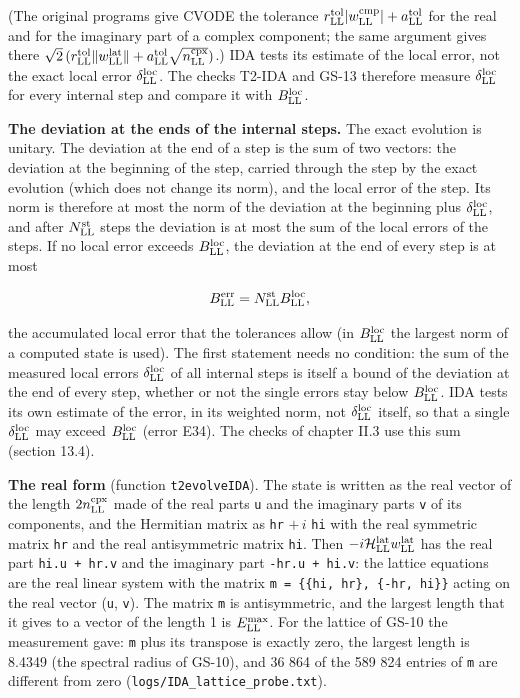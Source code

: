 \documentclass[
  10pt,
]{article}
\begin{document}
(The original programs give CVODE the tolerance
\(r^{\rm tol}_{\rm LL}\lvert w^{\rm cmp}_{\rm LL}\rvert+a^{\rm tol}_{\rm LL}\)
for the real and for the imaginary part of a complex component; the same
argument gives there
\(\sqrt2\,(r^{\rm tol}_{\rm LL}\lVert w^{\rm lat}_{\rm LL}\rVert+a^{\rm tol}_{\rm LL}\sqrt{n^{\rm cpx}_{\rm LL}})\).)
IDA tests its estimate of the local error, not the exact local error
\(\delta^{\rm loc}_{\rm LL}\). The checks T2-IDA and GS-13 therefore
measure \(\delta^{\rm loc}_{\rm LL}\) for every internal step and
compare it with \(B^{\rm loc}_{\rm LL}\).

\textbf{The deviation at the ends of the internal steps.} The exact
evolution is unitary. The deviation at the end of a step is the sum of
two vectors: the deviation at the beginning of the step, carried through
the step by the exact evolution (which does not change its norm), and
the local error of the step. Its norm is therefore at most the norm of
the deviation at the beginning plus \(\delta^{\rm loc}_{\rm LL}\), and
after \(N^{\rm st}_{\rm LL}\) steps the deviation is at most the sum of
the local errors of the steps. If no local error exceeds
\(B^{\rm loc}_{\rm LL}\), the deviation at the end of every step is at
most

\[B^{\rm err}_{\rm LL}=N^{\rm st}_{\rm LL}B^{\rm loc}_{\rm LL},\]

the accumulated local error that the tolerances allow (in
\(B^{\rm loc}_{\rm LL}\) the largest norm of a computed state is used).
The first statement needs no condition: the sum of the measured local
errors \(\delta^{\rm loc}_{\rm LL}\) of all internal steps is itself a
bound of the deviation at the end of every step, whether or not the
single errors stay below \(B^{\rm loc}_{\rm LL}\). IDA tests its own
estimate of the error, in its weighted norm, not
\(\delta^{\rm loc}_{\rm LL}\) itself, so that a single
\(\delta^{\rm loc}_{\rm LL}\) may exceed \(B^{\rm loc}_{\rm LL}\) (error
E34). The checks of chapter II.3 use this sum (section 13.4).

\textbf{The real form} (function \texttt{t2evolveIDA}). The state is
written as the real vector of the length \(2n^{\rm cpx}_{\rm LL}\) made
of the real parts \texttt{u} and the imaginary parts \texttt{v} of its
components, and the Hermitian matrix as \texttt{hr} \(+\,i\) \texttt{hi}
with the real symmetric matrix \texttt{hr} and the real antisymmetric
matrix \texttt{hi}. Then
\(-i\mathcal H^{\rm lat}_{\rm LL}w^{\rm lat}_{\rm LL}\) has the real
part \texttt{hi.u\ +\ hr.v} and the imaginary part
\texttt{-hr.u\ +\ hi.v}: the lattice equations are the real linear
system with the matrix \texttt{m\ =\ \{\{hi,\ hr\},\ \{-hr,\ hi\}\}}
acting on the real vector (\texttt{u}, \texttt{v}). The matrix
\texttt{m} is antisymmetric, and the largest length that it gives to a
vector of the length 1 is \(E^{\rm max}_{\rm LL}\). For the lattice of
GS-10 the measurement gave: \texttt{m} plus its transpose is exactly
zero, the largest length is 8.4349 (the spectral radius of GS-10), and
36 864 of the 589 824 entries of \texttt{m} are different from zero
(\texttt{logs/IDA\_lattice\_probe.txt}).
\end{document}
